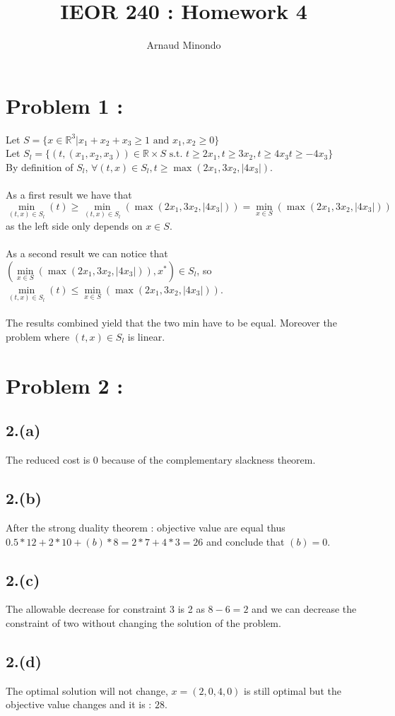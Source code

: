 \documentclass{article}
\title{IEOR 240 : Homework 4}
\author{Arnaud Minondo}
\begin{document}
\maketitle
\section*{Problem 1 :}
Let $S =\{x\in\mathbb{R}^3|x_1+x_2+x_3\ge 1\text{ and }x_1,x_2\ge0\}$
\\ 
Let $S_l = \{(t,(x_1,x_2,x_3))\in\mathbb{R}\times S \text{ s.t. }t\ge 2x_1, t\ge 3x_2, t\ge4x_3 t\ge -4x_3\} $ 
\\
By definition of $S_l$, $\forall (t,x)\in S_l, t\ge \max(2x_1,3x_2,|4x_3|)$. 
\\\\
As a first result we have that $\min\limits_{(t,x)\in S_l}(t)\ge \min\limits_{(t,x)\in S_l}(\max(2x_1,3x_2,|4x_3|)) = \min\limits_{x\in S}(\max(2x_1,3x_2,|4x_3|))$ as the left side only depends on $x\in S$.
\\\\
As a second result we can notice that $(\min\limits_{x\in S}(\max(2x_1,3x_2,|4x_3|)),x^*)\in S_l$, so $\min\limits_{(t,x)\in S_l}(t)\leq \min\limits_{x\in S}(\max(2x_1,3x_2,|4x_3|))$.
\\\\
The results combined yield that the two min have to be equal. Moreover the problem where $(t,x)\in S_l $ is linear.

\section*{Problem 2 :}
\subsection*{2.(a)}
The reduced cost is 0 because of the complementary slackness theorem.
\subsection*{2.(b)}
After the strong duality theorem : objective value are equal thus $0.5*12+2*10 +(b)*8= 2*7+4*3 = 26$ and conclude that $(b)=0$.
\subsection*{2.(c)}
The allowable decrease for constraint 3 is 2 as $8-6 = 2$ and we can decrease the constraint of two without changing the solution of the problem.
\subsection*{2.(d)}
The optimal solution will not change, $x=(2,0,4,0)$ is still optimal but the objective value changes and it is : $28$.
\end{document}
